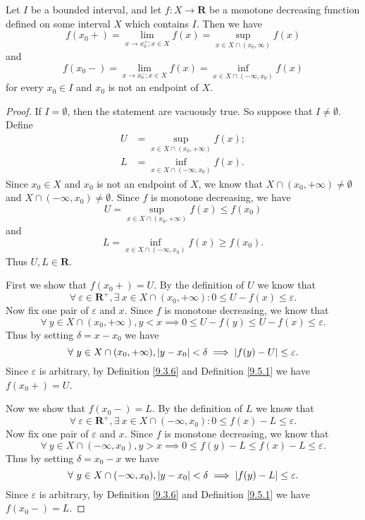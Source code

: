 \begin{additional corollary}\label{ac 11.8.2}
Let \(I\) be a bounded interval, and let \(f : X \to \mathbf{R}\) be a monotone decreasing function defined on some interval \(X\) which contains \(I\).
Then we have
\[
    f(x_0+) = \lim_{x \to x_0^+ ; x \in X} f(x) = \sup_{x \in X \cap (x_0, \infty)} f(x)
\]
and
\[
    f(x_0-) = \lim_{x \to x_0^- ; x \in X} f(x) = \inf_{x \in X \cap (-\infty, x_0)} f(x)
\]
for every \(x_0 \in I\) and \(x_0\) is not an endpoint of \(X\).
\end{additional corollary}

\begin{proof}
    If \(I = \emptyset\), then the statement are vacuously true.
    So suppose that \(I \neq \emptyset\).
    Define
    \begin{align*}
        U & = \sup_{x \in X \cap (x_0, +\infty)} f(x); \\
        L & = \inf_{x \in X \cap (-\infty, x_0)} f(x).
    \end{align*}
    Since \(x_0 \in X\) and \(x_0\) is not an endpoint of \(X\), we know that \(X \cap (x_0, +\infty) \neq \emptyset\) and \(X \cap (-\infty, x_0) \neq \emptyset\).
    Since \(f\) is monotone decreasing, we have
    \[
        U = \sup_{x \in X \cap (x_0, +\infty)} f(x) \leq f(x_0)
    \]
    and
    \[
        L = \inf_{x \in X \cap (-\infty, x_0)} f(x) \geq f(x_0).
    \]
    Thus \(U, L \in \mathbf{R}\).

    First we show that \(f(x_0+) = U\).
    By the definition of \(U\) we know that
    \[
        \forall\ \varepsilon \in \mathbf{R}^+, \exists\ x \in X \cap (x_0, +\infty) : 0 \leq U - f(x) \leq \varepsilon.
    \]
    Now fix one pair of \(\varepsilon\) and \(x\).
    Since \(f\) is monotone decreasing, we know that
    \[
        \forall\ y \in X \cap (x_0, +\infty), y < x \implies 0 \leq U - f(y) \leq U - f(x) \leq \varepsilon.
    \]
    Thus by setting \(\delta = x - x_0\) we have
    \[
        \forall\ y \in X \cap (x_0, +\infty), \abs*{y - x_0} < \delta \implies \abs*{f(y) - U} \leq \varepsilon.
    \]
    Since \(\varepsilon\) is arbitrary, by Definition \ref{9.3.6} and Definition \ref{9.5.1} we have \(f(x_0+) = U\).

    Now we show that \(f(x_0-) = L\).
    By the definition of \(L\) we know that
    \[
        \forall\ \varepsilon \in \mathbf{R}^+, \exists\ x \in X \cap (-\infty, x_0) : 0 \leq f(x) - L \leq \varepsilon.
    \]
    Now fix one pair of \(\varepsilon\) and \(x\).
    Since \(f\) is monotone decreasing, we know that
    \[
        \forall\ y \in X \cap (-\infty, x_0), y > x \implies 0 \leq f(y) - L \leq f(x) - L \leq \varepsilon.
    \]
    Thus by setting \(\delta = x_0 - x\) we have
    \[
        \forall\ y \in X \cap (-\infty, x_0), \abs*{y - x_0} < \delta \implies \abs*{f(y) - L} \leq \varepsilon.
    \]
    Since \(\varepsilon\) is arbitrary, by Definition \ref{9.3.6} and Definition \ref{9.5.1} we have \(f(x_0-) = L\).
\end{proof}

